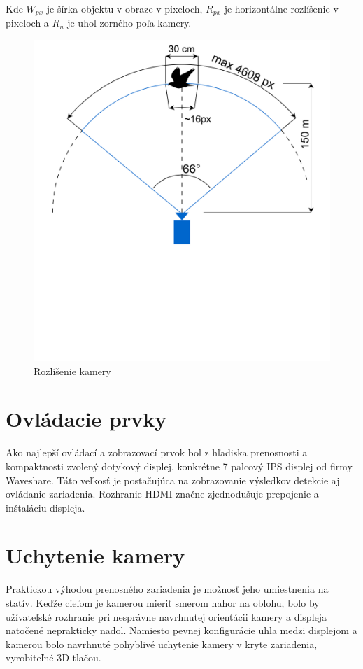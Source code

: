         Kde $W_{px}$ je šírka objektu v obraze v pixeloch, $R_{px}$ je horizontálne rozlíšenie v pixeloch a $R_{u}$ je uhol zorného poľa kamery.

        \begin{figure}[h]
            \centering
            \includegraphics[width=.6\textwidth]{obrazky/camera/fov.drawio.png}
            \caption{Rozlíšenie kamery}
        \end{figure}

    \section{Ovládacie prvky}

        Ako najlepší ovládací a zobrazovací prvok bol z hľadiska prenosnosti a kompaktnosti zvolený dotykový displej, konkrétne 7 palcový IPS displej od firmy Waveshare. Táto veľkosť je postačujúca na zobrazovanie výsledkov detekcie aj ovládanie zariadenia. Rozhranie HDMI značne zjednodušuje prepojenie a inštaláciu displeja.

    \section{Uchytenie kamery}

        Praktickou výhodou prenosného zariadenia je možnosť jeho umiestnenia na statív. Keďže cieľom je kamerou mieriť smerom nahor na oblohu, bolo by užívateľské rozhranie pri nesprávne navrhnutej orientácii kamery a displeja natočené neprakticky nadol. Namiesto pevnej konfigurácie uhla medzi displejom a kamerou bolo navrhnuté pohyblivé uchytenie kamery v kryte zariadenia, vyrobiteľné 3D tlačou.

